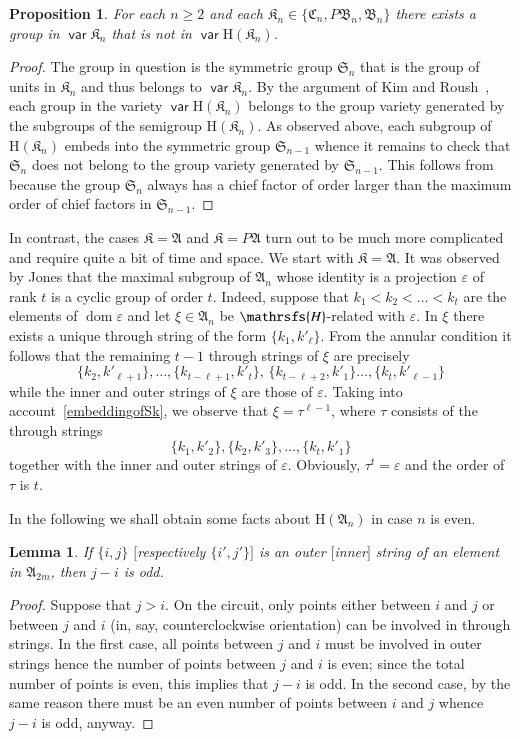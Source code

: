 \documentclass[preprint,1p,times]{elsarticle}
\DeclareMathOperator{\dom}{dom} \DeclareMathOperator{\ran}{ran}
\DeclareMathOperator{\var}{\mathsf{var}}
\numberwithin{equation}{section}
\newtheorem{Prop}[Thm]{Proposition}
\newtheorem{Lemma}[Thm]{Lemma}
\theoremstyle{remark}
\def\Hc{\mathrsfs{H}}
\def\ep{\varepsilon}
\def\H{\mathrm H}
\def\A{\mathfrak{A}}
\def\C{\mathfrak{C}}
\def\B{\mathfrak{B}}
\def\K{\mathfrak{K}}
\def\Sim{\mathfrak{S}}
\begin{document}
\begin{Prop}
\label{groups in the gap} For each $n\ge 2$ and each $\mathfrak{K}_n\in \{\C_n,P\B_n,\B_n\}$ there exists a group in
$\var\mathfrak{K}_n$ that is not in $\var\H(\mathfrak{K}_n)$.
\end{Prop}
\begin{proof}
The group in question is the symmetric group $\Sim_n$ that is the group of units in $\mathfrak{K}_n$ and thus belongs
to $\var\mathfrak{K}_n$. By the argument of Kim and Roush~\cite{KR}, each group in the variety $\var\H(\mathfrak{K}_n)$
belongs to the group variety generated by the subgroups of the semigroup $\H(\mathfrak{K}_n)$. As observed above, each
subgroup of $\H(\mathfrak{K}_n)$ embeds into the symmetric group $\Sim_{n-1}$ whence it remains to check that $\Sim_n$
does not belong to the group variety generated by $\Sim_{n-1}$. This follows from \cite[Theorem 51.2]{Ne} because the
group $\Sim_n$ always has a chief factor of order larger than the maximum order of chief factors in $\Sim_{n-1}$.
\end{proof}


In contrast, the cases $\K=\A$ and $\K=P\A$ turn out to be much more  complicated and require quite a bit of time and
space. We start with $\K=\A$. It was observed by Jones \cite{jones} that the maximal subgroup of $\A_n$ whose identity
is a projection $\ep$ of rank $t$ is a cyclic group of order $t$. Indeed, suppose that $k_1<k_2<\dots<k_t$ are the
elements of $\dom \ep$ and let $\xi\in \A_n$ be $\Hc$-related with $\ep$. In $\xi$ there exists a unique through string
of the form $\{k_1,k'_\ell\}$. From the annular condition it follows that the remaining $t-1$ through strings of $\xi$
are precisely
$$\{k_2,k'_{\ell+1}\},\dots,\{k_{t-\ell+1},k'_t\},\,\{k_{t-\ell+2},k'_1\}\dots,
\{k_t,k'_{\ell-1}\}$$ while the inner and outer strings of $\xi$ are those of $\ep$. Taking into
account~\eqref{embeddingofSk}, we observe that $\xi=\tau^{\ell-1}$, where $\tau$ consists of the through strings
$$\{k_1,k'_2\},\{k_2,k'_3\},\dots,\{k_t,k'_1\}$$
together with the inner and outer strings of $\ep$. Obviously,
 $\tau^t=\ep$ and the order of $\tau$ is $t$.

In the following we shall obtain some facts about $\H(\A_n)$ in case $n$ is even.
\begin{Lemma}\label{differenceininnerstrings}
If $\{i,j\}$ $[$respectively $\{i',j'\}]$ is an outer $[$inner$]$ string of an element in $\A_{2m}$, then $j-i$ is odd.
\end{Lemma}
\begin{proof} Suppose that $j>i$. On the circuit, only points either between
$i$ and $j$ or between $j$ and $i$ (in, say, counterclockwise orientation) can be involved in through strings. In the
first case, all points between $j$ and $i$ must be involved in outer strings hence the number of points between $j$ and
$i$ is even; since the total number of points is even, this implies that $j-i$ is odd. In the second case, by the same
reason there must be an even number of points between $i$ and $j$ whence $j-i$ is odd, anyway.
\end{proof}
\end{document}
